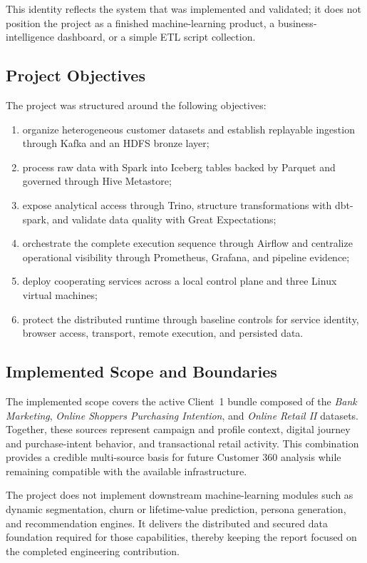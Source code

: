 This identity reflects the system that was implemented and validated; it does not position the project as a finished machine-learning product, a business-intelligence dashboard, or a simple ETL script collection.

\subsection{Project Objectives}
The project was structured around the following objectives:

\begin{enumerate}
    \item organize heterogeneous customer datasets and establish replayable ingestion through Kafka and an HDFS bronze layer;
    \item process raw data with Spark into Iceberg tables backed by Parquet and governed through Hive Metastore;
    \item expose analytical access through Trino, structure transformations with dbt-spark, and validate data quality with Great Expectations;
    \item orchestrate the complete execution sequence through Airflow and centralize operational visibility through Prometheus, Grafana, and pipeline evidence;
    \item deploy cooperating services across a local control plane and three Linux virtual machines;
    \item protect the distributed runtime through baseline controls for service identity, browser access, transport, remote execution, and persisted data.
\end{enumerate}

\subsection{Implemented Scope and Boundaries}
The implemented scope covers the active Client~1 bundle composed of the \textit{Bank Marketing}, \textit{Online Shoppers Purchasing Intention}, and \textit{Online Retail II} datasets. Together, these sources represent campaign and profile context, digital journey and purchase-intent behavior, and transactional retail activity. This combination provides a credible multi-source basis for future Customer 360 analysis while remaining compatible with the available infrastructure.

The project does not implement downstream machine-learning modules such as dynamic segmentation, churn or lifetime-value prediction, persona generation, and recommendation engines. It delivers the distributed and secured data foundation required for those capabilities, thereby keeping the report focused on the completed engineering contribution.


